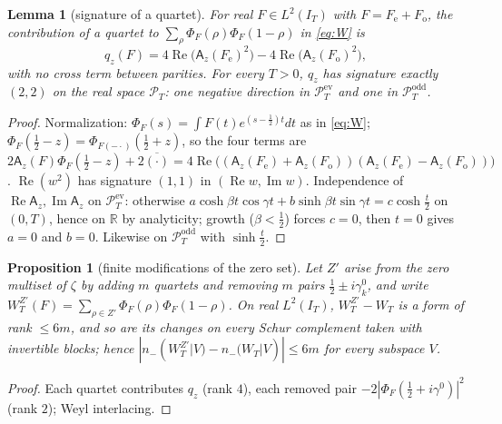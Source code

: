 \documentclass[11pt]{amsart}
\newtheorem{proposition}[theorem]{Proposition}
\newtheorem{lemma}[theorem]{Lemma}
\theoremstyle{definition}
\theoremstyle{remark}
\newcommand{\R}{\mathbb R}
\newcommand{\Rel}{\operatorname{Re}}
\newcommand{\Iml}{\operatorname{Im}}
\newcommand{\PT}{\mathcal P_T}
\newcommand{\IT}{I_T}
\begin{document}
\begin{lemma}[signature of a quartet]\label{thm:inertia-quartet}
For real $F\in L^2(\IT)$ with $F=F_{\mathrm e}+F_{\mathrm o}$, the contribution of a quartet to
$\sum_\rho\Phi_F(\rho)\Phi_F(1-\rho)$ in \eqref{eq:W} is
\[
q_z(F)=4\Rel\big(\mathsf A_z(F_{\mathrm e})^2\big)-4\Rel\big(\mathsf A_z(F_{\mathrm o})^2\big),
\]
with no cross term between parities. For every $T>0$, $q_z$ has signature exactly $(2,2)$ on the real space
$\PT$: one negative direction in $\PT^{\mathrm{ev}}$ and one in $\PT^{\mathrm{odd}}$.
\end{lemma}
\begin{proof}
Normalization: $\Phi_F(s)=\int F(t)e^{(s-\frac12)t}dt$ as
in \eqref{eq:W}; $\Phi_F(\frac12-z)=\Phi_{F(-\cdot)}(\frac12+z)$, so the four terms are
$2\mathsf A_z(F)\Phi_F(\frac12-z)+2\overline{(\cdot)}=4\Rel\big((\mathsf A_z(F_{\mathrm e})+\mathsf A_z(F_{\mathrm o}))(\mathsf A_z(F_{\mathrm e})-\mathsf A_z(F_{\mathrm o}))\big)$.
$\Rel(w^2)$ has signature $(1,1)$ in $(\Rel w,\Iml w)$. Independence of $\Rel\mathsf A_z,\Iml\mathsf A_z$ on
$\PT^{\mathrm{ev}}$: otherwise $a\cosh\beta t\cos\gamma t+b\sinh\beta t\sin\gamma t=c\cosh\frac t2$ on $(0,T)$, hence on
$\R$ by analyticity; growth ($\beta<\frac12$) forces $c=0$, then $t=0$ gives $a=0$ and $b=0$. Likewise on
$\PT^{\mathrm{odd}}$ with $\sinh\frac t2$.
\end{proof}

\begin{proposition}[finite modifications of the zero set]\label{thm:inertia-rank}
Let $Z'$ arise from the zero multiset of $\zeta$ by adding $m$ quartets and removing $m$ pairs
$\frac12\pm i\gamma^0_k$, and write $W^{Z'}_T(F)=\sum_{\rho\in Z'}\Phi_F(\rho)\Phi_F(1-\rho)$. On real $L^2(\IT)$,
$W^{Z'}_T-W_T$ is a form of rank $\le6m$, and so are its changes on every Schur complement taken with invertible
blocks; hence $|n_-(W^{Z'}_T|V)-n_-(W_T|V)|\le6m$ for every subspace $V$.
\end{proposition}
\begin{proof}
Each quartet contributes $q_z$ (rank $4$), each removed pair $-2|\Phi_F(\frac12+i\gamma^0)|^2$ (rank $2$); Weyl
interlacing.
\end{proof}
\end{document}
